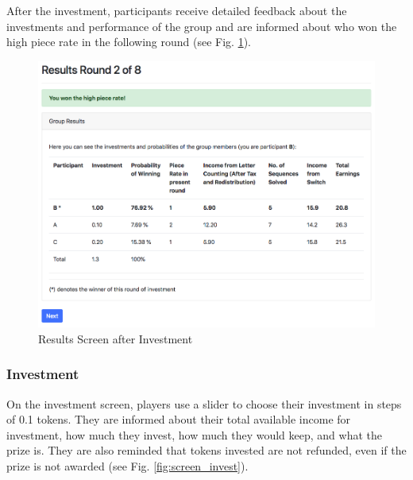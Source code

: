     After the investment, participants receive detailed feedback about the investments and performance of the group and are informed about who won the high piece rate in the following round (see Fig. \ref{fig:screen_results}).
    
    \begin{figure}[h!]
        \centering
        \includegraphics[scale = 0.4]{graphs/screen_results.png}
        \caption{Results Screen after Investment}
        \label{fig:screen_results}
    \end{figure}
    
    \vspace{-2mm}
    
    \subsubsection{Investment}
    
    On the investment screen, players use a slider to choose their investment in steps of 0.1 tokens. They are informed about their total available income for investment, how much they invest, how much they would keep, and what the prize is. They are also reminded that tokens invested are not refunded, even if the prize is not awarded (see Fig. \ref{fig:screen_invest}).
    
